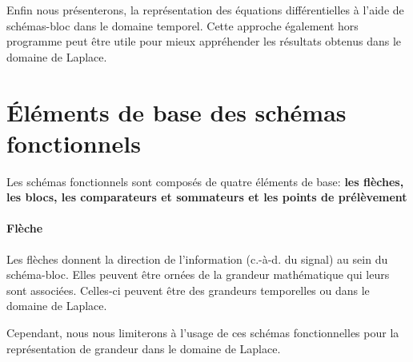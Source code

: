 Enfin nous présenterons, la représentation des équations différentielles
à l'aide de schémas-bloc dans le domaine temporel. Cette approche également
hors programme peut être utile pour mieux appréhender les résultats obtenus
dans le domaine de Laplace.
\section{\'Eléments de base des schémas fonctionnels}
Les schémas fonctionnels sont composés de quatre éléments de base:
\textbf{les flèches, les blocs, les comparateurs et sommateurs et les points 
de prélèvement}
\paragraph{Flèche}
Les flèches donnent la direction de l'information (c.-à-d. du signal) au sein 
du schéma-bloc. Elles peuvent être ornées de la grandeur mathématique qui 
leurs sont associées. 
Celles-ci peuvent être des grandeurs temporelles ou dans le domaine de Laplace. 
\begin{center}

\end{center}
Cependant, nous nous limiterons à l'usage de ces schémas fonctionnelles pour la 
représentation de grandeur dans le domaine de Laplace.

